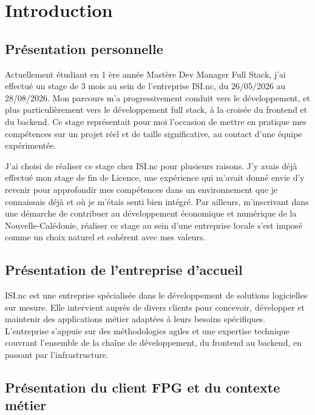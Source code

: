 
\chapter{Introduction}

\section{Présentation personnelle}

Actuellement étudiant en 1 ère année Mastère Dev Manager Full Stack, j'ai effectué un stage de 3 mois au sein de l'entreprise ISI.nc, du 26/05/2026 au 28/08/2026. Mon parcours m'a progressivement conduit vers le développement, et plus particulièrement vers le développement full stack, à la croisée du frontend et du backend. Ce stage représentait pour moi l'occasion de mettre en pratique mes compétences sur un projet réel et de taille significative, au contact d'une équipe expérimentée.

J'ai choisi de réaliser ce stage chez ISI.nc pour plusieurs raisons. J'y avais déjà effectué mon stage de fin de Licence, une expérience qui m'avait donné envie d'y revenir pour approfondir mes compétences dans un environnement que je connaissais déjà et où je m'étais senti bien intégré. Par ailleurs, m'inscrivant dans une démarche de contribuer au développement économique et numérique de la Nouvelle-Calédonie, réaliser ce stage au sein d'une entreprise locale s'est imposé comme un choix naturel et cohérent avec mes valeurs.

\section{Présentation de l'entreprise d'accueil}

ISI.nc est une entreprise spécialisée dans le développement de solutions
logicielles sur mesure. Elle intervient auprès de divers clients pour
concevoir, développer et maintenir des applications métier adaptées à
leurs besoins spécifiques. L'entreprise s'appuie sur des méthodologies
agiles et une expertise technique couvrant l'ensemble de la chaîne de
développement, du frontend au backend, en passant par l'infrastructure.

\section{Présentation du client FPG et du contexte métier}

